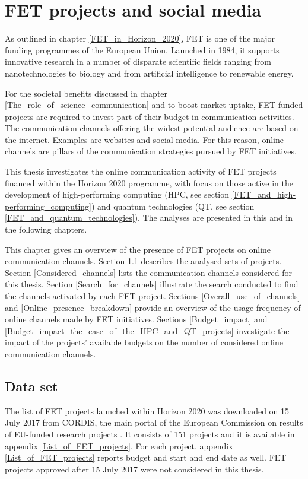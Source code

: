 \chapter{FET projects and social media} \label{FET_projects_and_social_media}
As outlined in chapter \ref{FET_in_Horizon_2020}, FET is one of the major funding programmes of the European Union. Launched in 1984, it supports innovative research in a number of disparate scientific fields ranging from nanotechnologies to biology and from artificial intelligence to renewable energy.

For the societal benefits discussed in chapter \ref{The_role_of_science_communication} and to boost market uptake, FET-funded projects are required to invest part of their budget in communication activities. The communication channels offering the widest potential audience are based on the internet. Examples are websites and social media. For this reason, online channels are pillars of the communication strategies pursued by FET initiatives. 

This thesis investigates the online communication activity of FET projects financed within the Horizon 2020 programme, with focus on those active in the development of high-performing computing (HPC, see section \ref{FET_and_high-performing_computing}) and quantum technologies (QT, see section \ref{FET_and_quantum_technologies}). The analyses are presented in this and in the following chapters.

This chapter gives an overview of the presence of FET projects on online communication channels. Section \ref{Data_set} describes the analysed sets of projects. Section \ref{Considered_channels} lists the communication channels considered for this thesis. Section \ref{Search_for_channels} illustrate the search conducted to find the channels activated by each FET project. Sections \ref{Overall_use_of_channels} and \ref{Online_presence_breakdown} provide an overview of the usage frequency of online channels made by FET initiatives. Sections \ref{Budget_impact} and \ref{Budget_impact_the_case_of_the_HPC_and_QT_projects} investigate the impact of the projects' available budgets on the number of considered online communication channels.

\section{Data set} \label{Data_set}
The list of FET projects launched within Horizon 2020 was downloaded on 15 July 2017 from CORDIS, the main portal of the European Commission on results of EU-funded research projects \cite{CORDIS}. It consists of 151 projects and it is available in appendix \ref{List_of_FET_projects}. For each project, appendix \ref{List_of_FET_projects} reports budget and start and end date as well. FET projects approved after 15 July 2017 were not considered in this thesis.

